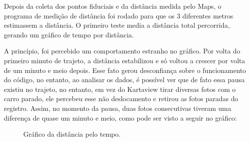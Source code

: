 \documentclass{article}
\begin{document}
\qquad Depois da coleta dos pontos fiduciais e da distância medida pelo Maps, o programa de medição de distância foi rodado para que os 3 diferentes metros estimassem a distância. O primeiro teste media a distância total percorrida, gerando um gráfico de tempo por distância.

\qquad A princípio, foi percebido um comportamento estranho no gráfico. Por volta do primeiro minuto de trajeto, a distância estabilizou e só voltou a crescer por volta de um minuto e meio depois. Esse fato gerou desconfiança sobre o funcionamento do código, no entanto, ao analisar os dados, é possível ver que de fato essa pausa existiu no trajeto, no entanto, em vez do Kartaview tirar diversas fotos com o carro parado, ele percebeu esse não deslocamento e retirou as fotos paradas do registro. Assim, no momento da pausa, duas fotos consecutivas tiveram uma diferença de quase um minuto e meio, como pode ser visto a seguir no gráfico:


\begin{figure}[!h]
    \centering
    \quad
    \caption{Gráfico da distância pelo tempo.}
\end{figure}
\end{document}
